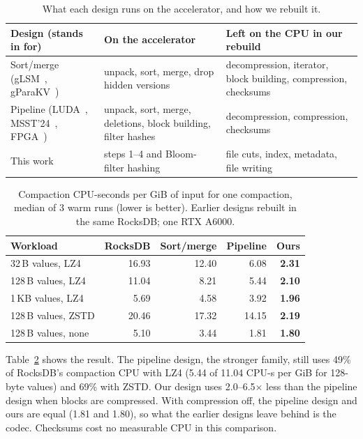 \documentclass[sigconf, nonacm]{acmart}
\begin{document}
\begin{table}[t]
  \caption{What each design runs on the accelerator, and how we rebuilt it.}
  \label{tab:designs}
  \small
  \begin{tabular}{p{}p{}p{}}
    \toprule
    Design (stands in for) & On the accelerator & Left on the CPU in our rebuild \\
    \midrule
    Sort/merge (gLSM~\cite{glsm2024}, gParaKV~\cite{gparakv2025}) & unpack, sort, merge,
      drop hidden versions & decompression, iterator, block building, compression,
      checksums \\
    Pipeline (LUDA~\cite{luda2020}, MSST'24~\cite{zhou2024msst}, FPGA~\cite{fpga2020}) &
      unpack, sort, merge, deletions, block building, filter hashes & decompression,
      compression, checksums \\
    This work & steps 1--4 and Bloom-filter hashing & file cuts, index, metadata, file
      writing \\
    \bottomrule
  \end{tabular}
\end{table}

\begin{table}[t]
  \caption{Compaction CPU-seconds per GiB of input for one compaction, median of 3 warm runs
  (lower is better). Earlier designs rebuilt in the same RocksDB; one RTX A6000.}
  \label{tab:prior-cpu}
  \small
  \begin{tabular}{lrrrr}
    \toprule
    Workload & RocksDB & Sort/merge & Pipeline & Ours \\
    \midrule
    32\,B values, LZ4   & 16.93 & 12.40 &  6.08 & \textbf{2.31} \\
    128\,B values, LZ4  & 11.04 &  8.21 &  5.44 & \textbf{2.10} \\
    1\,KB values, LZ4   &  5.69 &  4.58 &  3.92 & \textbf{1.96} \\
    128\,B values, ZSTD & 20.46 & 17.32 & 14.15 & \textbf{2.19} \\
    128\,B values, none &  5.10 &  3.44 &  1.81 & \textbf{1.80} \\
    \bottomrule
  \end{tabular}
\end{table}

Table~\ref{tab:prior-cpu} shows the result. The pipeline design, the stronger family, still
uses 49\% of RocksDB's compaction CPU with LZ4 (5.44 of 11.04 CPU-s per GiB for 128-byte values)
and 69\% with ZSTD. Our design uses 2.0--6.5$\times$ less than the pipeline design when
blocks are compressed. With compression off, the pipeline design and ours are equal (1.81 and
1.80), so what the earlier designs leave behind is the codec. Checksums cost no measurable CPU
in this comparison. %
\end{document}

